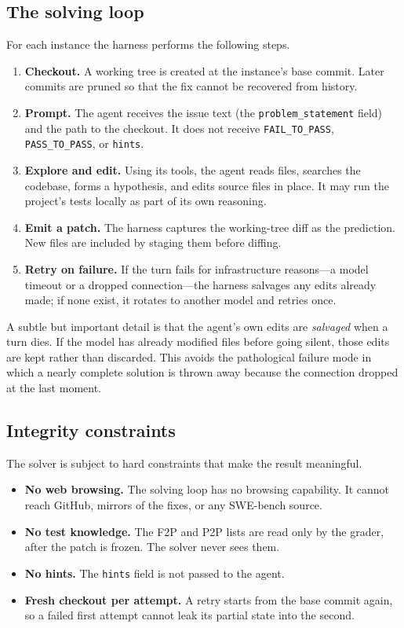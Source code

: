 \documentclass[11pt,a4paper]{article}
\begin{document}
\subsection{The solving loop}

For each instance the harness performs the following steps.

\begin{enumerate}[leftmargin=1.4em]
  \item \textbf{Checkout.} A working tree is created at the instance's base commit.
  Later commits are pruned so that the fix cannot be recovered from history.
  \item \textbf{Prompt.} The agent receives the issue text (the \texttt{problem\_statement}
  field) and the path to the checkout. It does not receive \texttt{FAIL\_TO\_PASS},
  \texttt{PASS\_TO\_PASS}, or \texttt{hints}.
  \item \textbf{Explore and edit.} Using its tools, the agent reads files, searches the
  codebase, forms a hypothesis, and edits source files in place. It may run the project's
  tests locally as part of its own reasoning.
  \item \textbf{Emit a patch.} The harness captures the working-tree diff as the
  prediction. New files are included by staging them before diffing.
  \item \textbf{Retry on failure.} If the turn fails for infrastructure reasons---a model
  timeout or a dropped connection---the harness salvages any edits already made; if none
  exist, it rotates to another model and retries once.
\end{enumerate}

A subtle but important detail is that the agent's own edits are \emph{salvaged} when a
turn dies. If the model has already modified files before going silent, those edits are
kept rather than discarded. This avoids the pathological failure mode in which a nearly
complete solution is thrown away because the connection dropped at the last moment.

\subsection{Integrity constraints}

The solver is subject to hard constraints that make the result meaningful.

\begin{itemize}[leftmargin=1.4em]
  \item \textbf{No web browsing.} The solving loop has no browsing capability. It cannot
  reach GitHub, mirrors of the fixes, or any SWE-bench source.
  \item \textbf{No test knowledge.} The F2P and P2P lists are read only by the grader,
  after the patch is frozen. The solver never sees them.
  \item \textbf{No hints.} The \texttt{hints} field is not passed to the agent.
  \item \textbf{Fresh checkout per attempt.} A retry starts from the base commit again,
  so a failed first attempt cannot leak its partial state into the second.
\end{itemize}
\end{document}
